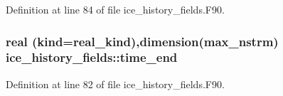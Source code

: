 Definition at line 84 of file ice\_\-history\_\-fields.F90.\hypertarget{namespaceice__history__fields_aaead8298e219c1e1308f21fc20ee5acd}{
\subsubsection[{time\_\-end}]{\setlength{\rightskip}{0pt plus 5cm}real (kind=real\_\-kind),dimension(max\_\-nstrm) {\bf ice\_\-history\_\-fields::time\_\-end}}}
\label{namespaceice__history__fields_aaead8298e219c1e1308f21fc20ee5acd}


Definition at line 82 of file ice\_\-history\_\-fields.F90.